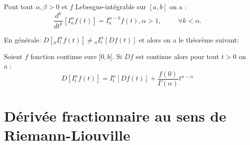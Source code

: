 \begin{proposition}
    Pout tout $\alpha, \beta >0$ et $f$ Lebesgue-intégrable sur $[a,b]$ on a :
    \begin{equation}
        \frac{d^k}{dt^k}[I_a^{\alpha} f(t)] = I_{a}^{\alpha - k} f(t) , \alpha >1, \hspace{1cm}\forall k <\alpha.
    \end{equation}
\end{proposition}
\begin{remarque}
    En générale: $D[_{a}I_t^{\alpha}f(t)] \neq {}_{a}I_t^{\alpha} [D f(t)]$ et alors on a le théorème suivant:
\end{remarque}
\begin{theoreme}
    Soient $f$ fonction continue sure $[0,b[$. Si $Df$ est continue alors pour tout $t>0$ on a :
    \begin{equation}
        D[I_{t}^{\alpha}f(t)] = I_{t}^{\alpha}[Df(t)]+\frac{f(0)}{\Gamma(\alpha)}t^{n-\alpha}
    \end{equation}
\end{theoreme}

\section{Dérivée fractionnaire au sens de Riemann-Liouville}
